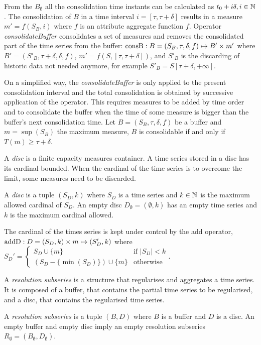 From the $B_{\emptyset}$ all the consolidation time instants can be
calculated as $t_0+i\delta, i\in\mathbb{N}$. The consolidation of $B$ in a
time interval $i=[\tau,\tau+\delta]$ results in a measure
$m'=f(S_B,i)$ where $f$ is an attribute aggregate function
$f$. Operator \emph{consolidateBuffer} consolidates a set of measures
and removes the consolidated part of the time series from the buffer:
$\operatorname{consB} : B=(S_B,\tau,\delta,f) \mapsto B' \times m'$ where $ B'=
(S'_B,\tau+\delta,\delta,f)$, $m' = f(S,[\tau,\tau+\delta])$, and
$S'_B$ is the discarding of historic data not needed anymore, for example
$S'_B = S[\tau+\delta,+\infty]$.

On a simplified way, the \emph{consolidateBuffer} is only applied to the present
consolidation interval and the total consolidation is obtained by
successive application of the operator. This requires measures to be
added by time order and to consolidate the buffer when the time of
some measure is bigger than the buffer's next consolidation time.  Let
$B=(S_B,\tau,\delta,f)$ be a buffer and $m=\sup(S_B)$ the maximum
measure, $B$ is consolidable if and only if $T(m) \geq
\tau+\delta$.


A \emph{disc} is a finite capacity measures container. A time series
stored in a disc has its cardinal bounded. When the cardinal of the
time series is to overcome the limit, some measures need to be
discarded.
\begin{definition}%
  A \emph{disc} is a tuple $(S_D,k)$ where $S_D$ is a time series and
  $k\in\mathbb{N}$ is the maximum allowed cardinal of $S_D$.  An empty disc
  $D_{\emptyset} = (\emptyset,k)$ has an empty time series and $k$ is
  the maximum cardinal allowed.
\end{definition}

The cardinal of the times series is kept under control by the add
operator, $\operatorname{addD} : D=(S_D,k)\times m\mapsto (S'_D,k)$ where %
$
 S_D' = \begin{cases}
  S_D\cup\{m\}                 & \text{if } |S_D|<k  \\
  (S_D-\{\min(S_D)\}) \cup \{m\} & \text{otherwise}
\end{cases}  
$.


A \emph{resolution subseries} is a structure that regularises and
aggregates a time series. It is composed of a buffer, that contains
the partial time series to be regularised, and a disc, that contains
the regularised time series.
\begin{definition}%
  A \emph{resolution subseries} is a tuple $(B,D)$ where $B$ is a
  buffer and $D$ is a disc.  An empty buffer and empty disc imply an
  empty resolution subseries $R_{\emptyset} =
  (B_{\emptyset},D_{\emptyset})$.
\end{definition}
 
